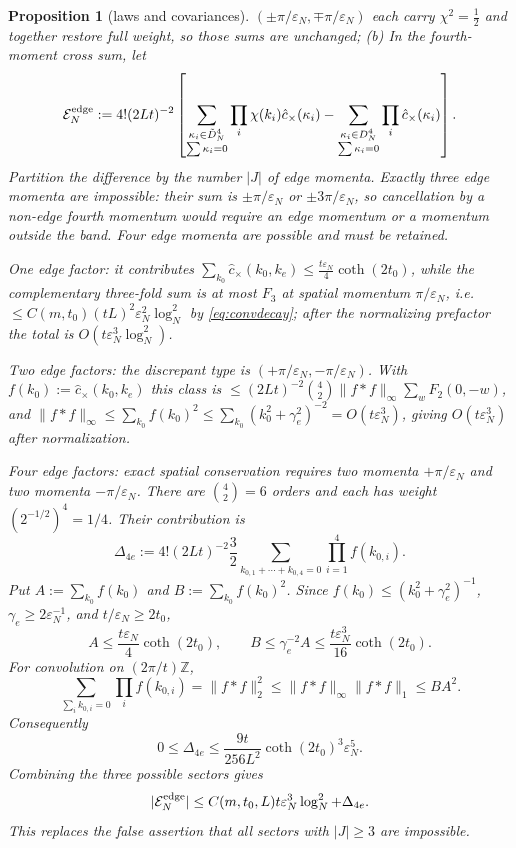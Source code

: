\documentclass[11pt,a4paper]{article}
\theoremstyle{plain}
\newtheorem{proposition}[theorem]{Proposition}
\theoremstyle{definition}
\newcommand{\Z}{\mathbb{Z}}
\newcommand{\eps}{\varepsilon}
\DeclareMathOperator{\cth}{coth}
\begin{document}
\begin{proposition}[laws and covariances]
$(\pm\pi/\eps_N,\mp\pi/\eps_N)$ each carry $\chi^2=\tfrac12$ and together restore
\emph{full} weight, so those sums are \emph{unchanged};
\emph{(b)} In the fourth-moment cross sum, let
\begin{equation}
 \mathcal E_N^{\rm edge}:=4!(2Lt)^{-2}
 \left[
 \sum_{\substack{\kappa_i\in\tilde D_N^4\\\sum\kappa_i=0}}
       \prod_i\chi(k_i)\hat c_\times(\kappa_i)
 -\sum_{\substack{\kappa_i\in D_N^4\\\sum\kappa_i=0}}
       \prod_i\hat c_\times(\kappa_i)
 \right].
 \label{eq:Eedge}
\end{equation}
Partition the difference by the number $|J|$ of edge momenta.  Exactly three edge
momenta are impossible: their sum is $\pm\pi/\eps_N$ or
$\pm3\pi/\eps_N$, so cancellation by a non-edge fourth momentum would require an
edge momentum or a momentum outside the band.  Four edge momenta are possible and
must be retained.

\emph{One edge factor:} it contributes
$\sum_{k_0}\hat c_\times(k_0,k_e)\le\tfrac{t\eps_N}4\cth(2t_0)$, while the
complementary three-fold sum is at most $F_3$ at spatial momentum $\pi/\eps_N$, i.e.\
$\le C(m,t_0)(tL)^2\eps_N^2\log_N^2$ by \eqref{eq:convdecay}; after the
normalizing prefactor the total is $O(t\eps_N^3\log_N^2)$.

\emph{Two edge factors:} the discrepant type is
$(+\pi/\eps_N,-\pi/\eps_N)$. With
$f(k_0):=\hat c_\times(k_0,k_e)$ this class is
$\le(2Lt)^{-2}\binom42\|f*f\|_\infty\sum_wF_2(0,-w)$, and
$\|f*f\|_\infty\le\sum_{k_0}f(k_0)^2\le\sum_{k_0}(k_0^2+\gamma_e^2)^{-2}
=O(t\eps_N^3)$, giving $O(t\eps_N^3)$ after normalization.

\emph{Four edge factors:} exact spatial conservation requires two momenta
$+\pi/\eps_N$ and two momenta $-\pi/\eps_N$.  There are $\binom42=6$
orders and each has weight $(2^{-1/2})^4=1/4$.  Their contribution is
\begin{equation}
 \Delta_{4e}:=4!(2Lt)^{-2}\frac32
 \sum_{k_{0,1}+\cdots+k_{0,4}=0}\prod_{i=1}^4f(k_{0,i}).
 \label{eq:four-edge}
\end{equation}
Put $A:=\sum_{k_0}f(k_0)$ and $B:=\sum_{k_0}f(k_0)^2$.  Since
$f(k_0)\le(k_0^2+\gamma_e^2)^{-1}$, $\gamma_e\ge2\eps_N^{-1}$, and
$t/\eps_N\ge2t_0$,
\[
 A\le\frac{t\eps_N}{4}\cth(2t_0),\qquad
 B\le\gamma_e^{-2}A\le\frac{t\eps_N^3}{16}\cth(2t_0).
\]
For convolution on $(2\pi/t)\Z$,
\[
 \sum_{\sum_i k_{0,i}=0}\prod_i f(k_{0,i})
 =\|f*f\|_2^2
 \le\|f*f\|_\infty\|f*f\|_1
 \le BA^2.
\]
Consequently
\begin{equation}
 0\le\Delta_{4e}\le
 \frac{9t}{256L^2}\cth(2t_0)^3\eps_N^5.
 \label{eq:four-edge-bound}
\end{equation}
Combining the three possible sectors gives
\begin{equation}
 |\mathcal E_N^{\rm edge}|
 \le C(m,t_0,L)t\eps_N^3\log_N^2+\Delta_{4e}.
 \label{eq:Eedge-bound}
\end{equation}
This replaces the false assertion that all sectors with $|J|\ge3$ are impossible.
\end{proposition}
\end{document}
